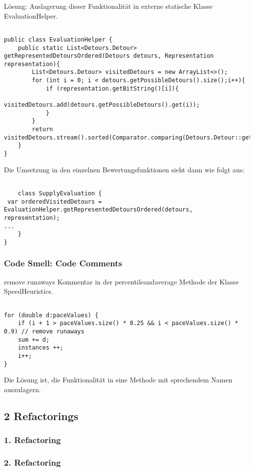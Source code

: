 Lösung: Auslagerung dieser Funktionalität in externe statische Klasse EvaluationHelper.

\begin{lstlisting}

public class EvaluationHelper {
    public static List<Detours.Detour> getRepresentedDetoursOrdered(Detours detours, Representation representation){
        List<Detours.Detour> visitedDetours = new ArrayList<>();
        for (int i = 0; i < detours.getPossibleDetours().size();i++){
            if (representation.getBitString()[i]){
                visitedDetours.add(detours.getPossibleDetours().get(i));
            }
        }
        return visitedDetours.stream().sorted(Comparator.comparing(Detours.Detour::getPosition)).toList();
    }
}
\end{lstlisting}

Die Umsetzung in den einzelnen Bewertungsfunktionen sieht dann wie folgt aus:

\begin{lstlisting}

	class SupplyEvaluation {
 var orderedVisitedDetours = EvaluationHelper.getRepresentedDetoursOrdered(detours, representation);
...	
	}
}
\end{lstlisting}



\subsubsection{Code Smell: Code Comments}

remove runaways Kommentar in der percentileandaverage Methode der Klasse SpeedHeuristics.


\begin{lstlisting}

for (double d:paceValues) {
	if (i + 1 > paceValues.size() * 0.25 && i < paceValues.size() * 0.9) // remove runaways
	sum += d;
	instances ++;
	i++;
}
\end{lstlisting}

Die Lösung ist, die Funktionalität in eine Methode mit sprechendem Namen auszulagern.

\subsection{2 Refactorings}

\subsubsection{1. Refactoring}

\subsubsection{2. Refactoring}